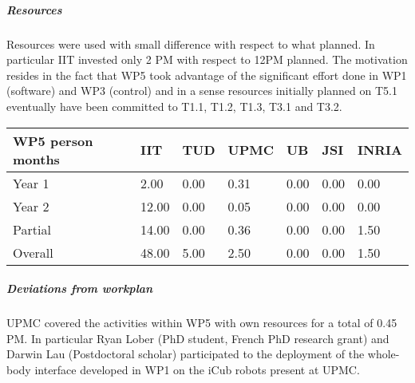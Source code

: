 
\subparagraph{Resources}

Resources were used with small difference with respect to what planned. In particular IIT invested only 2 PM with respect to 12PM planned. The motivation resides in the fact that WP5 took advantage of the significant effort done in WP1 (software) and WP3 (control) and in a sense resources initially planned on T5.1 eventually have been committed to T1.1, T1.2, T1.3, T3.1 and T3.2.

\begin{center}
\begin{tabular}{|C{1.5cm}|C{1.5cm}|C{1.5cm}|C{2cm}|C{2cm}|C{2cm}|C{2cm}|}
\hline
\footnotesize \textbf{WP5 person months}& \footnotesize \textbf{IIT}&\footnotesize \textbf{TUD}&\footnotesize \textbf{UPMC}& \footnotesize \textbf{UB} &\footnotesize \textbf{JSI} & \footnotesize \textbf{INRIA} \\ \hline
\footnotesize Year 1 &  2.00 & 0.00 & 0.31 & 0.00 & 0.00 & 0.00     \\  \hline
\footnotesize Year 2 &  12.00 & 0.00 & 0.05 & 0.00 & 0.00 & 0.00     \\  \hline
\footnotesize Partial &  14.00 & 0.00 & 0.36 & 0.00 & 0.00 & 1.50 \\ \hline \hline
\footnotesize Overall &  48.00 & 5.00 & 2.50 & 0.00 & 0.00 & 1.50 \\ \hline
\end{tabular}
\end{center}

\subparagraph{Deviations from workplan} 
UPMC covered the activities within WP5 with own resources for a total of 0.45 PM. In particular Ryan Lober (PhD student, French PhD research grant) and Darwin Lau (Postdoctoral scholar) participated to the deployment of the whole-body interface developed in WP1 on the iCub robots present at UPMC. 
